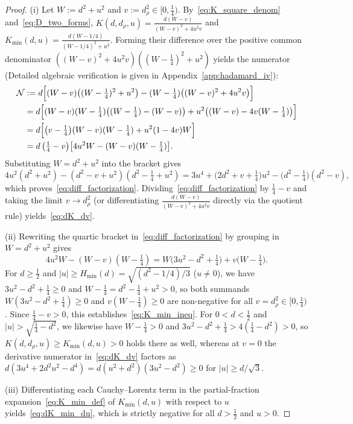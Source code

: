\documentclass[11pt,reqno]{amsart}
\theoremstyle{definition}
\theoremstyle{remark}
\numberwithin{equation}{section}
\begin{document}
\begin{proof}
(i) Let $W := d^2 + u^2$ and $v := d_\rho^2 \in [0, \frac{1}{4})$. By~\eqref{eq:K_square_denom} and~\eqref{eq:D_two_forms}, $K(d, d_\rho, u) = \frac{d(W - v)}{(W - v)^2 + 4u^2 v}$ and $K_{\min}(d,u) = \frac{d(W - 1/4)}{(W - 1/4)^2 + u^2}$. Forming their difference over the positive common denominator $((W - v)^2 + 4u^2 v)((W - \frac{1}{4})^2 + u^2)$ yields the numerator (Detailed algebraic verification is given in Appendix~\ref{app:hadamard_iv}):
\begin{align*}
\mathcal{N} &:= d\Bigl[(W - v)\bigl((W - \tfrac{1}{4})^2 + u^2\bigr) - (W - \tfrac{1}{4})\bigl((W - v)^2 + 4u^2 v\bigr)\Bigr] \\
&= d\Bigl[(W - v)(W - \tfrac{1}{4})\bigl((W - \tfrac{1}{4}) - (W - v)\bigr) + u^2\bigl((W - v) - 4v(W - \tfrac{1}{4})\bigr)\Bigr] \\
&= d\Bigl[\bigl(v - \tfrac{1}{4}\bigr)(W - v)(W - \tfrac{1}{4}) + u^2(1 - 4v)W\Bigr] \\
&= d\,\bigl(\tfrac{1}{4} - v\bigr)\bigl[4u^2 W - (W - v)(W - \tfrac{1}{4})\bigr].
\end{align*}
Substituting $W = d^2 + u^2$ into the bracket gives
\[
4u^2(d^2 + u^2) - (d^2 - v + u^2)(d^2 - \tfrac{1}{4} + u^2) = 3u^4 + \bigl(2d^2 + v + \tfrac{1}{4}\bigr)u^2 - \bigl(d^2 - \tfrac{1}{4}\bigr)(d^2 - v),
\]
which proves~\eqref{eq:diff_factorization}. Dividing~\eqref{eq:diff_factorization} by $\frac{1}{4} - v$ and taking the limit $v \to d_\rho^2$ (or differentiating $\frac{d(W-v)}{(W-v)^2 + 4u^2 v}$ directly via the quotient rule) yields~\eqref{eq:dK_dv}.

(ii) Rewriting the quartic bracket in~\eqref{eq:diff_factorization} by grouping in $W = d^2 + u^2$ gives
\[
4u^2 W - (W - v)(W - \tfrac{1}{4}) = W\bigl(3u^2 - d^2 + \tfrac{1}{4}\bigr) + v\bigl(W - \tfrac{1}{4}\bigr).
\]
For $d \ge \frac{1}{2}$ and $|u| \ge H_{\min}(d) = \sqrt{(d^2 - 1/4)/3}$ ($u \neq 0$), we have $3u^2 - d^2 + \frac{1}{4} \ge 0$ and $W - \frac{1}{4} = d^2 - \frac{1}{4} + u^2 > 0$, so both summands $W(3u^2 - d^2 + \frac{1}{4}) \ge 0$ and $v(W - \frac{1}{4}) \ge 0$ are non-negative for all $v = d_\rho^2 \in [0, \frac{1}{4})$. Since $\frac{1}{4} - v > 0$, this establishes~\eqref{eq:K_min_ineq}. For $0 < d < \frac{1}{2}$ and $|u| > \sqrt{\frac{1}{4} - d^2}$, we likewise have $W - \frac{1}{4} > 0$ and $3u^2 - d^2 + \frac{1}{4} > 4(\frac{1}{4} - d^2) > 0$, so $K(d, d_\rho, u) \ge K_{\min}(d,u) > 0$ holds there as well, whereas at $v = 0$ the derivative numerator in~\eqref{eq:dK_dv} factors as $d(3u^4 + 2d^2 u^2 - d^4) = d(u^2 + d^2)(3u^2 - d^2) \ge 0$ for $|u| \ge d/\sqrt{3}$.

(iii) Differentiating each Cauchy--Lorentz term in the partial-fraction expansion~\eqref{eq:K_min_def} of $K_{\min}(d,u)$ with respect to $u$ yields~\eqref{eq:dK_min_du}, which is strictly negative for all $d > \frac{1}{2}$ and $u > 0$.
\end{proof}
\end{document}
